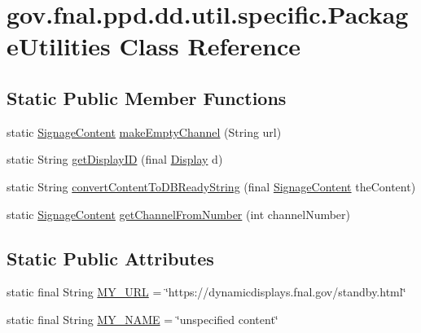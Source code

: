 \hypertarget{classgov_1_1fnal_1_1ppd_1_1dd_1_1util_1_1specific_1_1PackageUtilities}{\section{gov.\-fnal.\-ppd.\-dd.\-util.\-specific.\-Package\-Utilities Class Reference}
\label{classgov_1_1fnal_1_1ppd_1_1dd_1_1util_1_1specific_1_1PackageUtilities}
}
\subsection*{Static Public Member Functions}
\begin{DoxyCompactItemize}
\item 
static \hyperlink{interfacegov_1_1fnal_1_1ppd_1_1dd_1_1signage_1_1SignageContent}{Signage\-Content} \hyperlink{classgov_1_1fnal_1_1ppd_1_1dd_1_1util_1_1specific_1_1PackageUtilities_a21b0b417b695336725658a6fde76b042}{make\-Empty\-Channel} (String url)
\item 
static String \hyperlink{classgov_1_1fnal_1_1ppd_1_1dd_1_1util_1_1specific_1_1PackageUtilities_ac76f976bf20f252c63f3fe1a5e934d55}{get\-Display\-I\-D} (final \hyperlink{interfacegov_1_1fnal_1_1ppd_1_1dd_1_1signage_1_1Display}{Display} d)
\item 
static String \hyperlink{classgov_1_1fnal_1_1ppd_1_1dd_1_1util_1_1specific_1_1PackageUtilities_a77b0bd55fcfdef42895b14ee8fd86e1b}{convert\-Content\-To\-D\-B\-Ready\-String} (final \hyperlink{interfacegov_1_1fnal_1_1ppd_1_1dd_1_1signage_1_1SignageContent}{Signage\-Content} the\-Content)
\item 
static \hyperlink{interfacegov_1_1fnal_1_1ppd_1_1dd_1_1signage_1_1SignageContent}{Signage\-Content} \hyperlink{classgov_1_1fnal_1_1ppd_1_1dd_1_1util_1_1specific_1_1PackageUtilities_aed411058ce30f98adc137f40cfa053f8}{get\-Channel\-From\-Number} (int channel\-Number)
\end{DoxyCompactItemize}
\subsection*{Static Public Attributes}
\begin{DoxyCompactItemize}
\item 
static final String \hyperlink{classgov_1_1fnal_1_1ppd_1_1dd_1_1util_1_1specific_1_1PackageUtilities_a2c28b8b9f5e920adc416d0fb452c4a15}{M\-Y\-\_\-\-U\-R\-L} = \char`\"{}https\-://dynamicdisplays.\-fnal.\-gov/standby.\-html\char`\"{}
\item 
static final String \hyperlink{classgov_1_1fnal_1_1ppd_1_1dd_1_1util_1_1specific_1_1PackageUtilities_a150f5e795e043d677c508269d554d74e}{M\-Y\-\_\-\-N\-A\-M\-E} = \char`\"{}unspecified content\char`\"{}
\end{DoxyCompactItemize}


